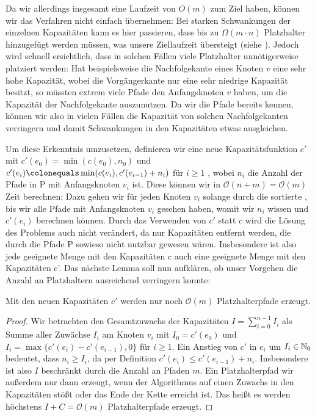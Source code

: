 Da wir allerdings insgesamt eine Laufzeit von $O(m)$ zum Ziel haben, können wir das  Verfahren
nicht einfach übernehmen:
Bei starken Schwankungen der einzelnen Kapazitäten kann es hier passieren, dass bis zu $\Omega(m\cdot n)$
Platzhalter hinzugefügt werden müssen, was unsere Ziellaufzeit übersteigt (siehe ).
Jedoch wird schnell ersichtlich, dass in solchen Fällen viele Platzhalter unnötigerweise platziert werden:
Hat beispielsweise die Nachfolgekante eines Knoten $v$ eine sehr hohe Kapazität, wobei die Vorgängerkante nur eine sehr
niedrige Kapazität besitzt, so müssten extrem viele Pfade den Anfangsknoten $v$ haben, um die Kapazität der
Nachfolgekante auszunutzen.
Da wir die Pfade bereits kennen, können wir also in vielen Fällen die Kapazität von solchen Nachfolgekanten verringern und
damit Schwankungen in den Kapazitäten etwas ausgleichen.

Um diese Erkenntnis umzusetzen, definieren wir eine neue Kapazitätsfunktion $c'$ mit $c'(e_0) = \min(c(e_0), n_0)$ und
$ c'(e_i) \colonequals \min(c(e_i), c'(e_{i-1}) + n_i)$ für $i \geq 1$ , wobei $n_i$ die Anzahl der Pfade in P mit
Anfangsknoten $v_i$ ist.
Diese können wir in $\mathcal O(n + m) = \mathcal O(m)$ Zeit berechnen: Dazu gehen wir für jeden Knoten $v_i$ solange durch die sortierte
, bis wir alle Pfade mit Anfangsknoten $v_i$ gesehen haben, womit wir
$n_i$ wissen und $c'(e_i)$ berechnen können.
Durch das Verwenden von $c'$ statt $c$ wird die Lösung des Problems auch nicht verändert, da nur Kapazitäten entfernt
werden, die durch die Pfade P sowieso nicht nutzbar gewesen wären.
Insbesondere ist also jede geeignete Menge mit den Kapazitäten c auch eine geeignete Menge mit den Kapazitäten c'.
Das nächste Lemma soll nun aufklären, ob unser Vorgehen die Anzahl an Platzhaltern ausreichend verringern konnte:

\begin{lemma}
    Mit den neuen Kapazitäten $c'$ werden nur noch $\mathcal O(m)$ Platzhalterpfade erzeugt.
\end{lemma}
\begin{proof}
    Wir betrachten den Gesamtzuwachs der Kapazitäten $I = \sum_{i = 0}^{n-1} I_i$ als Summe aller Zuwächse $I_i$ am
    Knoten $v_i$ mit $I_0 = c'(e_0)$ und $I_i = \max\{c'(e_i) - c'(e_{i-1}), 0\}$ für $i \geq 1$.
    Ein Anstieg von $c'$ in $e_i$ um $I_i \in \mathbb N_0$ bedeutet, dass $n_i \geq I_i$, da per Definition
    $c'(e_i) \leq c'(e_{i-1}) + n_i$.
    Insbesondere ist also $I$ beschränkt durch die Anzahl an Pfaden $m$.
    Ein Platzhalterpfad wir außerdem nur dann erzeugt, wenn der Algorithmus auf einen Zuwachs in den Kapazitäten stößt
    oder das Ende der Kette erreicht ist.
    Das heißt es werden höchstens $I + C = \mathcal O(m)$ Platzhalterpfade erzeugt.
\end{proof}

